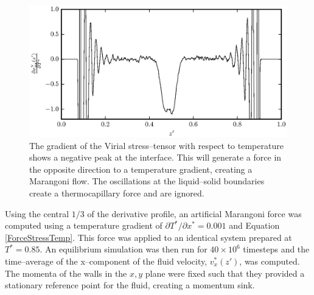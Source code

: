 \begin{figure}[h]
\centering
\includegraphics[scale=0.8]{PisVirForce}
\caption{The gradient of the Virial stress--tensor with respect to temperature shows a negative peak at the interface.
This will generate a force in the opposite direction to a temperature gradient, creating a Marangoni flow.
The oscillations at the liquid--solid boundaries create a thermocapillary force and are ignored.}
\label{PisVirForce}
\end{figure}
\FloatBarrier

Using the central $1/3$ of the derivative profile, an artificial Marangoni force was computed using a temperature gradient of $\partial T^{*} / \partial x^{*} = 0.001$ and Equation \ref{ForceStressTemp}.
This force was applied to an identical system prepared at $T^{*} = 0.85$.
An equilibrium simulation was then run for $40 \times 10^{6}$ timesteps and the time--average of the x--component of the fluid velocity, $v^{*}_{x}(z')$, was computed.
The momenta of the walls in the $x,y$ plane were fixed such that they provided a stationary reference point for the fluid, creating a momentum sink.

